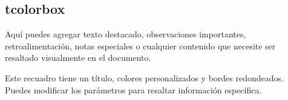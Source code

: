 
\subsection{tcolorbox}

\begin{tcolorbox}
    Aquí puedes agregar texto destacado, observaciones importantes, 
    retroalimentación, notas especiales o cualquier contenido que 
    necesite ser resaltado visualmente en el documento.
\end{tcolorbox}

\begin{tcolorbox}[%
    title={Ejemplo con Título},     %
    colback=yellow!10,              %
    colframe=orange!80!black,       %
    fonttitle=\bfseries,            %
    coltitle=black,                 %
    boxrule=1pt,                    %
    arc=6pt                         %
]
    Este recuadro tiene un título, colores personalizados y bordes redondeados.
    Puedes modificar los parámetros para resaltar información específica.
\end{tcolorbox}
